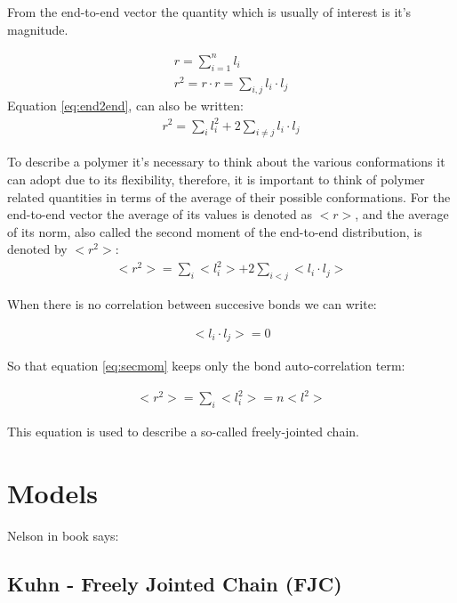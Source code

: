 From  the end-to-end  vector  the quantity
which is usually of interest is it's magnitude.

\begin{gather}
\label{eq:end2end}
r = \sum_{i=1}^{n} l_{i}\\
r^2 = r \cdot r = \sum_{i,j}l_{i} \cdot l_{j}
\end{gather}
Equation \ref{eq:end2end}, can also be written:
\begin{gather}
r^2 = \sum_{i}l_{i}^{2} + 2 \sum_{i\neq j} l_{i} \cdot l_{j}
\end{gather}  

To  describe a  polymer  it's  necessary to  think  about the  various
conformations it can adopt  due to its flexibility, therefore, it
is important  to think of polymer  related quantities in  terms of the
average of their possible conformations. For the end-to-end vector the
average of  its values  is denoted  as $<r>$, and  the average  of its
norm, also called the second moment of the end-to-end distribution, is
denoted by $<r^2>$:
\begin{gather}
\label{eq:secmom}  
<r^2>=\sum_{i}<l_{i}^2> + 2\sum_{i<j}<l_{i} \cdot l_{j}>
\end{gather}  

When there is no correlation between succesive bonds we can write:

\begin{gather}
\label{eq:nocorr}
<l_{i} \cdot l_{j}> = 0
\end{gather}

So that equation \ref{eq:secmom} keeps only the bond auto-correlation term:

\begin{gather}
<r^2> = \sum_{i}<l_{i}^2> = n<l^2>
\end{gather}  

This equation is used to describe a so-called freely-jointed chain.





\section{Models}

Nelson in book says:



\subsection{Kuhn - Freely Jointed Chain (FJC)}

